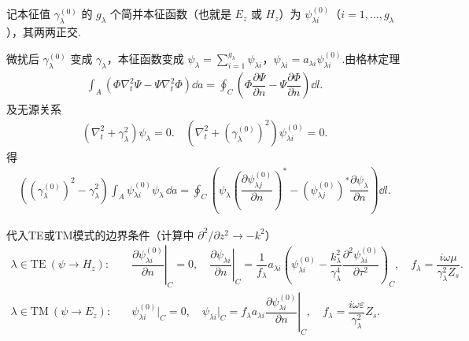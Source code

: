 记本征值 \(\gamma_{\lambda}^{(0)}\) 的 \(g_{\lambda}\) 个简并本征函数（也就是 \(E_z\) 或 \(H_z\)）为 \(\psi_{\lambda i}^{(0)}\)（\(i = 1, \dots, g_{\lambda}\)），其两两正交.

微扰后 \(\gamma_{\lambda}^{(0)}\) 变成 \(\gamma_{\lambda}\)，本征函数变成 \(\psi_{\lambda} = \sum_{i=1}^{g_{\lambda}} \psi_{\lambda i}\)，\(\psi_{\lambda i} = a_{\lambda i} \psi_{\lambda i}^{(0)}\).由格林定理
\begin{align*}
	\int_A \left( \Phi \nabla_t^2 \Psi - \Psi \nabla_t^2 \Phi \right) \dd a = \oint_C \left( \Phi \dfrac{\partial \Psi}{\partial n} - \Psi \dfrac{\partial \Phi}{\partial n} \right) \dd l.
\end{align*}
及无源关系
\begin{align*}
	(\nabla_t^2 + \gamma_{\lambda}^2) \psi_{\lambda} = 0. \quad (\nabla_t^2 + (\gamma_{\lambda}^{(0)})^2) \psi_{\lambda i}^{(0)} = 0.
\end{align*}
得
\begin{align*}
	\left( (\gamma_{\lambda}^{(0)})^2 - \gamma_{\lambda}^2 \right) \int_A \psi_{\lambda i}^{(0)} \psi_{\lambda} \, \dd a = \oint_C \left( \psi_{\lambda} \left( \dfrac{\partial \psi_{\lambda j}^{(0)}}{\partial n} \right)^* - \left( \psi_{\lambda j}^{(0)} \right)^* \dfrac{\partial \psi_{\lambda}}{\partial n} \right) \dd l.
\end{align*}

代入TE或TM模式的边界条件（计算中 \(\partial^2/\partial z^2 \to -k^2\)）
\begin{align*}
	\lambda \in \text{TE}\ (\psi \to H_z):\quad& \left. \dfrac{\partial \psi_{\lambda i}^{(0)}}{\partial n} \right|_C = 0, \quad
	\left. \dfrac{\partial \psi_{\lambda i}}{\partial n} \right|_C = \dfrac{1}{f_{\lambda}} a_{\lambda i} \left( \psi_{\lambda i}^{(0)} - \dfrac{k_{\lambda}^2}{\gamma_{\lambda}^{4}} \dfrac{\partial^2 \psi_{\lambda i}^{(0)}}{\partial{\tau}^2} \right)_C, \quad f_{\lambda} = \dfrac{i\omega\mu}{\gamma_{\lambda}^{2} Z_s}.\\
	\lambda \in \text{TM}\ (\psi \to E_z):\quad& \psi_{\lambda i}^{(0)} \big|_C = 0, \quad
	\psi_{\lambda i} \big|_C = \left. f_{\lambda} a_{\lambda i} \dfrac{\partial \psi_{\lambda i}^{(0)}}{\partial n} \right|_C, \quad f_{\lambda} = \dfrac{i\omega\varepsilon}{\gamma_{\lambda}^{2}} Z_s.
\end{align*}

